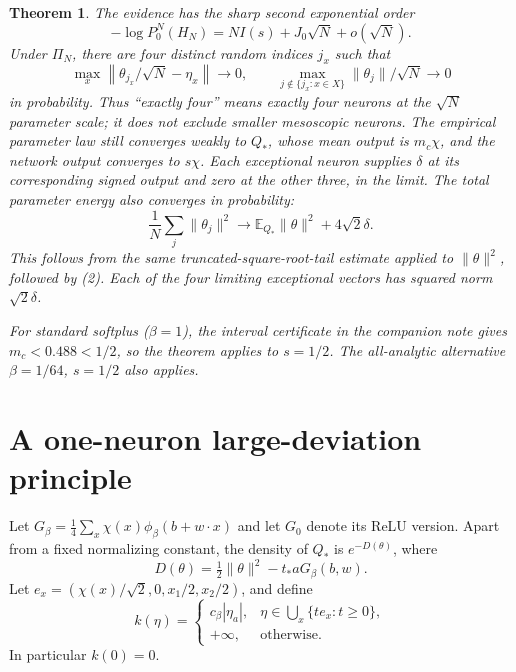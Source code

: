 \documentclass[11pt]{article}
\newtheorem{theorem}{Theorem}\newtheorem{lemma}[theorem]{Lemma}
\newcommand{\E}{\mathbb E}\newcommand{\Pp}{\mathbb P}
\begin{document}
\begin{theorem}
The evidence has the sharp second exponential order
\[
 -\log P_0^N(H_N)=NI(s)+J_0\sqrt N+o(\sqrt N).                 \tag{1}
\]
Under $\Pi_N$, there are four distinct random indices $j_x$ such that
\[
 \max_x\left\|\theta_{j_x}/\sqrt N-\eta_x\right\|
       \longrightarrow0,
 \qquad
 \max_{j\notin\{j_x:x\in X\}}\|\theta_j\|/\sqrt N
       \longrightarrow0                                    \tag{2}
\]
in probability. Thus ``exactly four'' means exactly four neurons at
the $\sqrt N$ parameter scale; it does not exclude smaller mesoscopic
neurons. The empirical parameter law still converges weakly to $Q_*$,
whose mean output is $m_c\chi$, and the network output converges to
$s\chi$. Each exceptional neuron supplies $\delta$ at its corresponding
signed output and zero at the other three, in the limit.
The total parameter energy also converges in probability:
\[
 \frac1N\sum_j\|\theta_j\|^2
   \longrightarrow \E_{Q_*}\|\theta\|^2+4\sqrt2\delta.
\]
This follows from the same truncated-square-root-tail estimate applied
to $\|\theta\|^2$, followed by (2). Each of the four limiting exceptional
vectors has squared norm $\sqrt2\delta$.

For standard softplus ($\beta=1$), the interval certificate in the
companion note gives $m_c<0.488<1/2$, so the theorem applies to $s=1/2$.
The all-analytic alternative $\beta=1/64$, $s=1/2$ also applies.
\end{theorem}

\section{A one-neuron large-deviation principle}
Let $G_\beta=\frac14\sum_x\chi(x)\phi_\beta(b+w\cdot x)$ and
let $G_0$ denote its ReLU version. Apart from a fixed normalizing
constant, the density of $Q_*$ is $e^{-D(\theta)}$, where
\[
 D(\theta)=\tfrac12\|\theta\|^2-t_*aG_\beta(b,w).
\]
Let $e_x=(\chi(x)/\sqrt2,0,x_1/2,x_2/2)$, and define
\[
 k(\eta)=
 \begin{cases}
  c_\beta|\eta_a|,&\eta\in\bigcup_x\{t e_x:t\ge0\},\\
  +\infty,&\text{otherwise}.
 \end{cases}                                                \tag{3}
\]
In particular $k(0)=0$.
\end{document}
